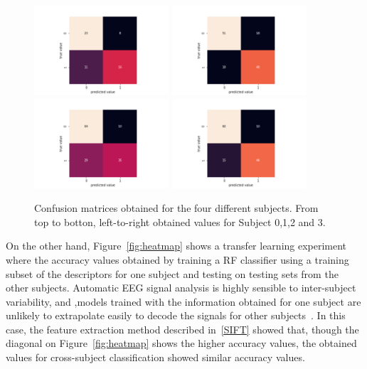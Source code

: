 \documentclass[review]{elsarticle}
\begin{document}
\begin{figure}[h!]
\centering
\includegraphics[width=5cm]{images/12_confusionmatrix.png}
\includegraphics[width=5cm]{images/35_confusionmatrix.png}\\
\includegraphics[width=5cm]{images/65_confusionmatrix.png}
\includegraphics[width=5cm]{images/68_confusionmatrix.png}
\caption[Patch Geometry]{Confusion matrices obtained for the four different subjects. From top to botton, left-to-right obtained values for Subject 0,1,2 and 3.}
\label{fig:confusionmatrix}
\end{figure}


On the other hand, Figure~\ref{fig:heatmap} shows a transfer learning experiment where the accuracy values obtained by training a RF classifier using a training subset of the descriptors for one subject and testing on testing sets from the other subjects.  Automatic EEG signal analysis is highly sensible to inter-subject variability, and ,models trained with the information obtained for one subject are unlikely to extrapolate easily to decode the signals for other subjects~\cite{Wan2021}.  In this case, the feature extraction method described in~\ref{SIFT} showed that, though the diagonal on Figure~\ref{fig:heatmap} shows the higher accuracy values, the obtained values for cross-subject classification showed similar accuracy values.  
\end{document}
